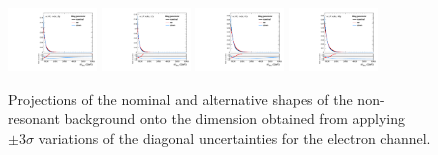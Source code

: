 \begin{figure}[htbp]
  \centering
  \includegraphics[width=0.21\textwidth]{fig/analysisAppendix/systs_nonRes_e_HP_nobb_LDy_Diag_ProjX.pdf}
  \includegraphics[width=0.21\textwidth]{fig/analysisAppendix/systs_nonRes_e_LP_nobb_LDy_Diag_ProjX.pdf}
  \includegraphics[width=0.21\textwidth]{fig/analysisAppendix/systs_nonRes_e_HP_nobb_HDy_Diag_ProjX.pdf}
  \includegraphics[width=0.21\textwidth]{fig/analysisAppendix/systs_nonRes_e_LP_nobb_HDy_Diag_ProjX.pdf}\\
  \caption{
    Projections of the nominal and alternative shapes of the non-resonant background onto the \MVV dimension obtained from applying $\pm3\sigma$ variations of the diagonal uncertainties for the electron channel.
  }
  \label{fig:systNonResMVV_Diag}
\end{figure}

